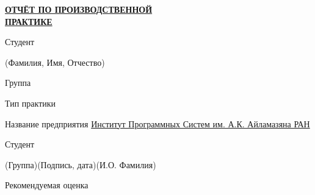 \documentclass[14pt, russian]{scrartcl}
\begin{document}
\sloppy

\begin{titlepage}
\thispagestyle{empty}

\bmstuheader

\vspace{3em}
 
\begin{center}
\Large {\textbf{\uline{ОТЧЁТ ПО ПРОИЗВОДСТВЕННОЙ}}} \\ {\textbf{\uline{ПРАКТИКЕ}}}
\end{center}\normalsize

\vspace{2ex}
\noindent Студент \underline{\hspace{406pt}}

\vspace{-2.1ex}
\noindent\hspace{31ex}\scriptsize{(Фамилия, Имя, Отчество)}\normalsize

\vspace{0.7ex}
\noindent Группа \underline{\hspace{50pt}}
 
\vspace{2ex}
\noindent Тип практики \underline{\hspace{373pt}}

\vspace{2.5ex}
\noindent Название предприятия \underline{\hspace{16pt}\footnotesize Институт Программных Систем им. А.К. Айламазяна РАН\hspace{12pt}}\normalsize

\vspace{\fill}
 

\noindent Студент \underline{\hspace{1.5cm}} \hfill \underline{\hspace{4cm}}\quad
\underline{\hspace{4cm}}

\vspace{-2.1ex}
\noindent\hspace{9ex}\scriptsize{(Группа)}\normalsize\hspace{170pt}\hspace{2ex}\scriptsize{(Подпись, дата)}\normalsize\hspace{30pt}\hspace{6ex}\scriptsize{(И.О. Фамилия)}\normalsize

\bigskip

\noindent Рекомендуемая оценка\hfill\underline{\hspace{195pt}}\hfill


\end{titlepage}
\end{document}
